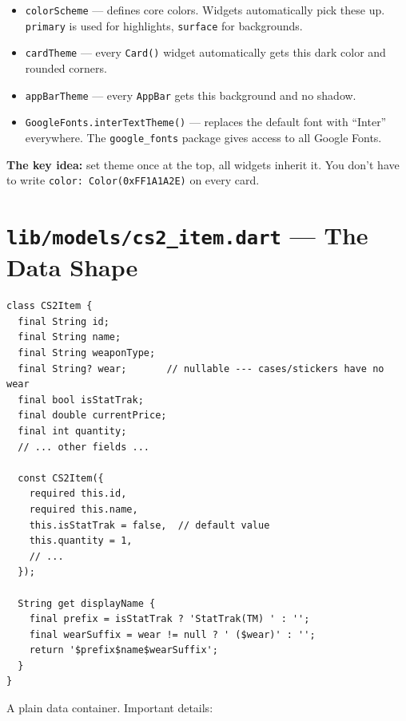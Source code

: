 \documentclass[11pt, a4paper]{article}
\begin{document}
\begin{itemize}
    \item \texttt{colorScheme} --- defines core colors. Widgets automatically pick these up. \texttt{primary} is used for highlights, \texttt{surface} for backgrounds.
    \item \texttt{cardTheme} --- every \texttt{Card()} widget automatically gets this dark color and rounded corners.
    \item \texttt{appBarTheme} --- every \texttt{AppBar} gets this background and no shadow.
    \item \texttt{GoogleFonts.interTextTheme()} --- replaces the default font with ``Inter'' everywhere. The \texttt{google\_fonts} package gives access to all Google Fonts.
\end{itemize}

\textbf{The key idea:} set theme once at the top, all widgets inherit it. You don't have to write \texttt{color: Color(0xFF1A1A2E)} on every card.

\newpage

\section{\texttt{lib/models/cs2\_item.dart} --- The Data Shape}

\begin{lstlisting}
class CS2Item {
  final String id;
  final String name;
  final String weaponType;
  final String? wear;       // nullable --- cases/stickers have no wear
  final bool isStatTrak;
  final double currentPrice;
  final int quantity;
  // ... other fields ...

  const CS2Item({
    required this.id,
    required this.name,
    this.isStatTrak = false,  // default value
    this.quantity = 1,
    // ...
  });

  String get displayName {
    final prefix = isStatTrak ? 'StatTrak(TM) ' : '';
    final wearSuffix = wear != null ? ' ($wear)' : '';
    return '$prefix$name$wearSuffix';
  }
}
\end{lstlisting}

A plain data container. Important details:
\end{document}
